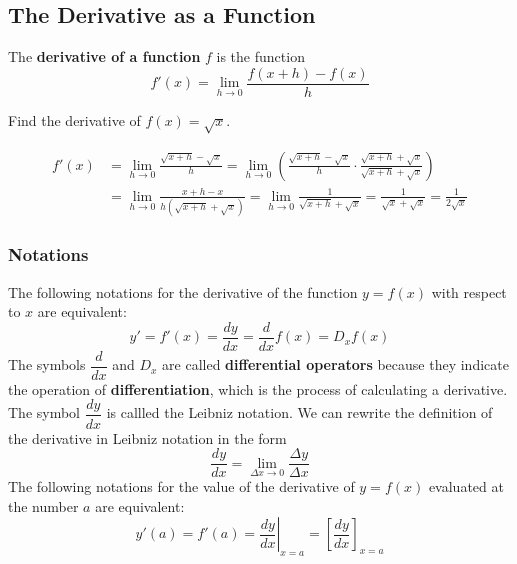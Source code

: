 \subsection{The Derivative as a Function}

\begin{definition}
    The \textbf{derivative of a function} \(f\) is the function
    \[f'(x)=\lim_{h\to 0}\frac{f(x+h)-f(x)}{h}\]
\end{definition}
\begin{problem}
    Find the derivative of \(f(x)=\sqrt{x}\).
\end{problem}
\begin{solution}
    \begin{align*}
        f'(x) &= \lim_{h\to 0}\frac{\sqrt{x+h}-\sqrt{x}}{h}=\lim_{h\to 0}
        \left(\frac{\sqrt{x+h}-\sqrt{x}}{h}\cdot
        \frac{\sqrt{x+h}+\sqrt{x}}{\sqrt{x+h}+\sqrt{x}}\right) \\
        &= \lim_{h\to 0}\frac{x+h-x}{h(\sqrt{x+h}+\sqrt{x})}
        =\lim_{h\to 0}\frac{1}{\sqrt{x+h}+\sqrt{x}}
        =\frac{1}{\sqrt{x}+\sqrt{x}}=\frac{1}{2\sqrt{x}} 
    \end{align*}
\end{solution}

\subsubsection*{Notations}
The following notations for the derivative of the function \(y=f(x)\) with
respect to \(x\) are equivalent:
\[y'=f'(x)=\frac{dy}{dx}=\frac{d}{dx}f(x)=D_x f(x)\]
The symbols \(\dfrac{d}{dx}\) and \(D_x\) are called \textbf{differential operators}
because they indicate the operation of \textbf{differentiation},
which is the process of calculating a derivative.
The symbol \(\dfrac{dy}{dx}\) is callled the Leibniz notation.
We can rewrite the definition of the derivative in Leibniz notation in the
form
\[\frac{dy}{dx}=\lim_{\Delta x\to0}\frac{\Delta y}{\Delta x}\]
The following notations for the value of the derivative of \(y=f(x)\)
evaluated at the number \(a\) are equivalent:
\[y'(a)=f'(a)=\left.\frac{dy}{dx}\right|_{x=a}
=\left[\frac{dy}{dx}\right]_{x=a}\]


